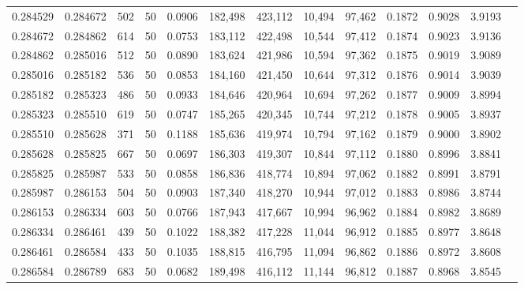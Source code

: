\begin{tabular}{rrrrrrrrrrrrr}
0.284529 & 0.284672 &   502 &  50 &                                     0.0906 & 182,498 & 423,112 &  10,494 &  97,462 & 0.1872 & 0.9028 & 3.9193 \\
0.284672 & 0.284862 &   614 &  50 &                                     0.0753 & 183,112 & 422,498 &  10,544 &  97,412 & 0.1874 & 0.9023 & 3.9136 \\
0.284862 & 0.285016 &   512 &  50 &                                     0.0890 & 183,624 & 421,986 &  10,594 &  97,362 & 0.1875 & 0.9019 & 3.9089 \\
0.285016 & 0.285182 &   536 &  50 &                                     0.0853 & 184,160 & 421,450 &  10,644 &  97,312 & 0.1876 & 0.9014 & 3.9039 \\
0.285182 & 0.285323 &   486 &  50 &                                     0.0933 & 184,646 & 420,964 &  10,694 &  97,262 & 0.1877 & 0.9009 & 3.8994 \\
0.285323 & 0.285510 &   619 &  50 &                                     0.0747 & 185,265 & 420,345 &  10,744 &  97,212 & 0.1878 & 0.9005 & 3.8937 \\
0.285510 & 0.285628 &   371 &  50 &                                     0.1188 & 185,636 & 419,974 &  10,794 &  97,162 & 0.1879 & 0.9000 & 3.8902 \\
0.285628 & 0.285825 &   667 &  50 &                                     0.0697 & 186,303 & 419,307 &  10,844 &  97,112 & 0.1880 & 0.8996 & 3.8841 \\
0.285825 & 0.285987 &   533 &  50 &                                     0.0858 & 186,836 & 418,774 &  10,894 &  97,062 & 0.1882 & 0.8991 & 3.8791 \\
0.285987 & 0.286153 &   504 &  50 &                                     0.0903 & 187,340 & 418,270 &  10,944 &  97,012 & 0.1883 & 0.8986 & 3.8744 \\
0.286153 & 0.286334 &   603 &  50 &                                     0.0766 & 187,943 & 417,667 &  10,994 &  96,962 & 0.1884 & 0.8982 & 3.8689 \\
0.286334 & 0.286461 &   439 &  50 &                                     0.1022 & 188,382 & 417,228 &  11,044 &  96,912 & 0.1885 & 0.8977 & 3.8648 \\
0.286461 & 0.286584 &   433 &  50 &                                     0.1035 & 188,815 & 416,795 &  11,094 &  96,862 & 0.1886 & 0.8972 & 3.8608 \\
0.286584 & 0.286789 &   683 &  50 &                                     0.0682 & 189,498 & 416,112 &  11,144 &  96,812 & 0.1887 & 0.8968 & 3.8545 \\

\end{tabular}
